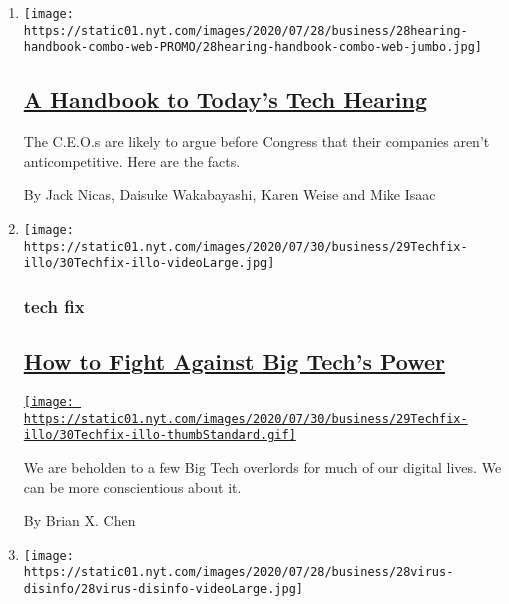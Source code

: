 \begin{enumerate}
\def\labelenumi{\arabic{enumi}.}
\item
  \texttt{[image: https://static01.nyt.com/images/2020/07/28/business/28hearing-handbook-combo-web-PROMO/28hearing-handbook-combo-web-jumbo.jpg]}

  \hypertarget{a-handbook-to-todays-tech-hearing}{%
  \subsection{\texorpdfstring{\href{/2020/07/29/technology/tech-ceos-congress-what-to-know.html}{A
  Handbook to Today's Tech
  Hearing}}{A Handbook to Today's Tech Hearing}}\label{a-handbook-to-todays-tech-hearing}}

  The C.E.O.s are likely to argue before Congress that their companies
  aren't anticompetitive. Here are the facts.

  By Jack Nicas, Daisuke Wakabayashi, Karen Weise and Mike Isaac
\item
  \texttt{[image: https://static01.nyt.com/images/2020/07/30/business/29Techfix-illo/30Techfix-illo-videoLarge.jpg]}

  \hypertarget{tech-fix}{%
  \subsubsection{tech fix}\label{tech-fix}}

  \hypertarget{how-to-fight-against-big-techs-power}{%
  \subsection{\texorpdfstring{\href{/2020/07/29/technology/personaltech/big-tech-power-how-to-fight.html}{How
  to Fight Against Big Tech's
  Power}}{How to Fight Against Big Tech's Power}}\label{how-to-fight-against-big-techs-power}}

  \href{/2020/07/29/technology/personaltech/big-tech-power-how-to-fight.html}{\texttt{[image: https://static01.nyt.com/images/2020/07/30/business/29Techfix-illo/30Techfix-illo-thumbStandard.gif]}}

  We are beholden to a few Big Tech overlords for much of our digital
  lives. We can be more conscientious about it.

  By Brian X. Chen
\item
  \texttt{[image: https://static01.nyt.com/images/2020/07/28/business/28virus-disinfo/28virus-disinfo-videoLarge.jpg]}


\end{enumerate}
